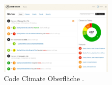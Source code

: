 \begin{figure}[!htb]
	\centerline{\includegraphics[width=0.5\textwidth]{img/code-climate}}
	\caption{Code Climate Oberfläche \cite{code-climate}.}
	\label{code-climate}
\end{figure}